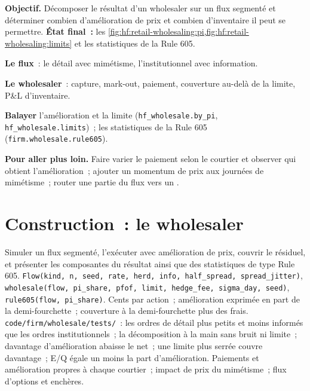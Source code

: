 \begin{tutorial}
\textbf{Objectif.} Décomposer le résultat d'un wholesaler sur un flux segmenté et déterminer combien d'amélioration de prix et combien d'inventaire il peut se permettre.
\textbf{État final~:} les \cref{fig:hf:retail-wholesaling:pi,fig:hf:retail-wholesaling:limits} et les statistiques de la Rule 605.
\begin{tutsteps}
\item \textbf{Le flux}~: le détail avec mimétisme, l'institutionnel avec information.
\label{lst:hf:retail-wholesaling:flow}
\item \textbf{Le wholesaler}~: capture, mark-out, paiement, couverture au-delà de la limite, P\&L d'inventaire.
\label{lst:hf:retail-wholesaling:wholesale}
\item \textbf{Balayer} l'amélioration et la limite (\texttt{hf\_wholesale.by\_pi}, \texttt{hf\_wholesale.limits})~; les statistiques de la Rule 605
(\texttt{firm.wholesale.rule605}).
\end{tutsteps}
\textbf{Pour aller plus loin.} Faire varier le paiement selon le courtier et observer qui obtient l'amélioration~; ajouter un momentum de prix aux journées de mimétisme~; router une partie du
flux vers un .
\end{tutorial}

\section{Construction~: le wholesaler}\label{bld:hf:retail-wholesaling:wholesale}

\begin{build}
 Simuler un flux segmenté, l'exécuter avec amélioration de prix, couvrir le résiduel, et présenter les composantes du résultat ainsi que des
statistiques de type Rule 605.
 \texttt{Flow(kind, n, seed, rate, herd, info, half\_spread, spread\_jitter)},
\texttt{wholesale(flow, pi\_share, pfof, limit, hedge\_fee, sigma\_day, seed)}, \texttt{rule605(flow, pi\_share)}.
 Cents par action~; amélioration exprimée en part de la demi-fourchette~; couverture à la demi-fourchette plus des frais.
 \texttt{code/firm/wholesale/tests/}~: les ordres de détail plus petits et moins informés que les ordres institutionnels~; la décomposition à
la main sans bruit ni limite~; davantage d'amélioration abaisse le net~; une limite plus serrée couvre davantage~; E/Q égale un moins la part d'amélioration.
 Paiements et amélioration propres à chaque courtier~; impact de prix du mimétisme~; flux d'options et enchères.
\end{build}

